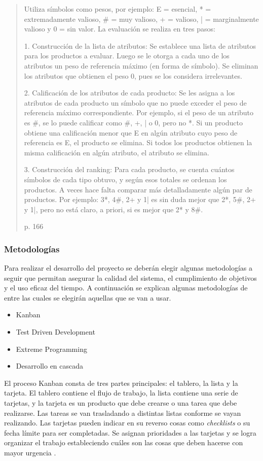 \documentclass[twoside]{article}
\begin{document}
\blockquote[p. 166]{Utiliza símbolos como pesos, por ejemplo: E = esencial, * = extremadamente valioso, \# = muy valioso, + = valioso, | = marginalmente valioso y 
0 = sin valor. La evaluación se realiza en tres pasos: 

1. Construcción de la lista de atributos: Se establece una lista de atributos para los 
productos a evaluar. Luego se le otorga a cada uno de los atributos un peso de 
referencia máximo (en forma de símbolo). Se eliminan los atributos que obtienen el 
peso 0, pues se los considera irrelevantes. 

2. Calificación de los atributos de cada producto: Se les asigna a los atributos de cada 
producto un símbolo que no puede exceder el peso de referencia máximo 
 correspondiente. Por ejemplo, si el peso de un atributo es \#, se lo puede calificar como 
\#, +, | o 0, pero no *. Si un producto obtiene una calificación menor que E en algún 
atributo cuyo peso de referencia es E, el producto se elimina. Si todos los productos 
obtienen la misma calificación en algún atributo, el atributo se elimina. 

3. Construcción del ranking: Para cada producto, se cuenta cuántos símbolos de cada 
tipo obtuvo, y según esos totales se ordenan los productos. A veces hace falta 
comparar más detalladamente algún par de productos. Por ejemplo: 3*, 4\#, 2+ y 1| es 
sin duda mejor que 2*, 5\#, 2+ y 1|, pero no está claro, a priori, si es mejor que 2* y 8\#. }
\subsubsection{Metodologías}
Para realizar el desarrollo del proyecto se deberán elegir algunas metodologías a seguir que permitan asegurar la calidad del sistema, el cumplimiento de objetivos y el uso eficaz del tiempo. A continuación se explican algunas metodologías de entre las cuales se elegirán aquellas que se van a usar.
\begin{itemize}
    \item Kanban
    \item Test Driven Development
    \item Extreme Programming
    \item Desarrollo en cascada
\end{itemize}
El proceso Kanban consta de tres partes principales: el tablero, la lista y la tarjeta. El tablero contiene el flujo de trabajo, la lista contiene una serie de tarjetas, y la tarjeta es un producto que debe crearse o una tarea que debe realizarse. Las tareas se van trasladando a distintas listas conforme se vayan realizando. Las tarjetas pueden indicar en su reverso cosas como \textit{checklists} o su fecha límite para ser completadas. Se asignan prioridades a las tarjetas y se logra organizar el trabajo estableciendo cuáles son las cosas que deben hacerse con mayor urgencia \parencite{completeGuideAgile}.
\end{document}
